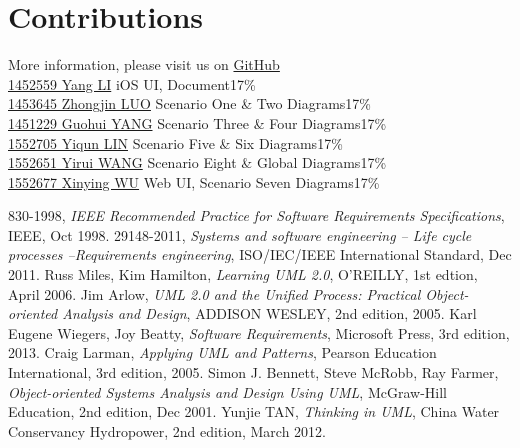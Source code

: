\documentclass[12pt]{scrreprt}
\begin{document}
\chapter{Contributions}
More information, please visit us on \href{https://github.com/zjzsliyang/42003201ObjectOrientedAnalysisAndDesign}{GitHub}
\vspace{3mm}\\
\href{https://github.com/zjzsliyang}{{\color{blue}1452559 Yang LI}} \hspace{17mm} iOS UI, Document\hfill 17\%\\
\href{https://github.com/tjluozhongjin}{{\color{blue}1453645 Zhongjin LUO}} \hspace{5mm} Scenario One \& Two Diagrams\hfill 17\%\\
\href{https://github.com/Yghifi}{{\color{blue}1451229 Guohui YANG}} \hspace{4.5mm} Scenario Three \& Four Diagrams\hfill 17\%\\
\href{https://github.com/lyqun}{{\color{blue}1552705 Yiqun LIN}} \hspace{11mm} Scenario Five \& Six Diagrams\hfill 17\%\\
\href{https://github.com/Charon0622}{{\color{blue}1552651 Yirui WANG}} \hspace{7mm} Scenario Eight \& Global Diagrams\hfill 17\%\\
\href{https://github.com/CandiceGemini}{{\color{blue}1552677 Xinying WU}} \hspace{8mm} Web UI, Scenario Seven Diagrams\hfill 17\%

\begin{thebibliography}{99}
  830-1998,
  \emph{IEEE Recommended Practice for Software Requirements Specifications},
  IEEE,
  Oct 1998.
  29148-2011,
  \emph{Systems and software engineering -- Life cycle processes --Requirements engineering},
  ISO/IEC/IEEE International Standard,
  Dec 2011.
  Russ Miles, Kim Hamilton,
  \emph{Learning UML 2.0},
  O'REILLY,
  1st edtion,
  April 2006.
  Jim Arlow,
  \emph{UML 2.0 and the Unified Process: Practical Object-oriented Analysis and Design},
  ADDISON WESLEY,
  2nd edition,
  2005.
  Karl Eugene Wiegers, Joy Beatty,
  \emph{Software Requirements},
  Microsoft Press,
  3rd edition,
  2013.
  Craig Larman,
  \emph{Applying UML and Patterns},
  Pearson Education International,
  3rd edition,
  2005.
  Simon J. Bennett, Steve McRobb, Ray Farmer,
  \emph{Object-oriented Systems Analysis and Design Using UML},
  McGraw-Hill Education,
  2nd edition,
  Dec 2001.
  Yunjie TAN,
  \emph{Thinking in UML},
  China Water Conservancy Hydropower,
  2nd edition,
  March 2012.
\end{thebibliography}
\end{document}
